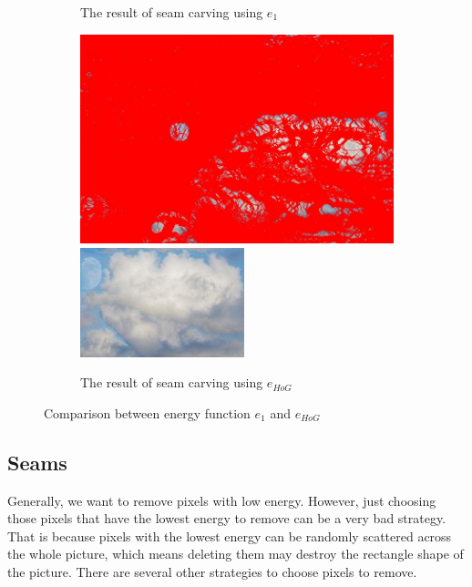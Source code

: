 \documentclass[final]{cvpr}
\begin{document}
\begin{figure}[htb]
\begin{center}
\begin{subfigure}[b]{0.48\linewidth}
    \caption{The result of seam carving using $e_1$}
\end{subfigure}
\begin{subfigure}[b]{0.48\linewidth}
    \includegraphics[width=\textwidth]{cloud_seam_carving_HoG_records.jpg}
    \includegraphics[width=\textwidth]{cloud_seam_carving_HoG.jpg}
    \caption{The result of seam carving using $e_{HoG}$}
\end{subfigure}
\end{center}
\caption{Comparison between energy function $e_1$ and $e_{HoG}$}
\label{fig:cloud_seam_carving_HoG}
\end{figure}
\subsection{Seams}
Generally, we want to remove pixels with low energy.
However, just choosing those pixels that have the lowest energy to remove can be a very bad strategy.
That is because pixels with the lowest energy can be randomly scattered across the whole picture, which means deleting them may destroy the rectangle shape of the picture.
There are several other strategies to choose pixels to remove.
\end{document}
